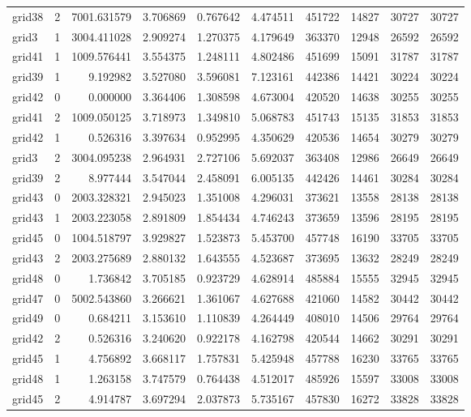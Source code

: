 \begin{longtable}{|l|r|r|r|r|r|r|r|r|r|}
grid38 & 2 & 7001.631579 & 3.706869 & 0.767642 & 4.474511 & 451722 & 14827 & 30727 & 30727 \\
grid3 & 1 & 3004.411028 & 2.909274 & 1.270375 & 4.179649 & 363370 & 12948 & 26592 & 26592 \\
grid41 & 1 & 1009.576441 & 3.554375 & 1.248111 & 4.802486 & 451699 & 15091 & 31787 & 31787 \\
grid39 & 1 & 9.192982 & 3.527080 & 3.596081 & 7.123161 & 442386 & 14421 & 30224 & 30224 \\
grid42 & 0 & 0.000000 & 3.364406 & 1.308598 & 4.673004 & 420520 & 14638 & 30255 & 30255 \\
grid41 & 2 & 1009.050125 & 3.718973 & 1.349810 & 5.068783 & 451743 & 15135 & 31853 & 31853 \\
grid42 & 1 & 0.526316 & 3.397634 & 0.952995 & 4.350629 & 420536 & 14654 & 30279 & 30279 \\
grid3 & 2 & 3004.095238 & 2.964931 & 2.727106 & 5.692037 & 363408 & 12986 & 26649 & 26649 \\
grid39 & 2 & 8.977444 & 3.547044 & 2.458091 & 6.005135 & 442426 & 14461 & 30284 & 30284 \\
grid43 & 0 & 2003.328321 & 2.945023 & 1.351008 & 4.296031 & 373621 & 13558 & 28138 & 28138 \\
grid43 & 1 & 2003.223058 & 2.891809 & 1.854434 & 4.746243 & 373659 & 13596 & 28195 & 28195 \\
grid45 & 0 & 1004.518797 & 3.929827 & 1.523873 & 5.453700 & 457748 & 16190 & 33705 & 33705 \\
grid43 & 2 & 2003.275689 & 2.880132 & 1.643555 & 4.523687 & 373695 & 13632 & 28249 & 28249 \\
grid48 & 0 & 1.736842 & 3.705185 & 0.923729 & 4.628914 & 485884 & 15555 & 32945 & 32945 \\
grid47 & 0 & 5002.543860 & 3.266621 & 1.361067 & 4.627688 & 421060 & 14582 & 30442 & 30442 \\
grid49 & 0 & 0.684211 & 3.153610 & 1.110839 & 4.264449 & 408010 & 14506 & 29764 & 29764 \\
grid42 & 2 & 0.526316 & 3.240620 & 0.922178 & 4.162798 & 420544 & 14662 & 30291 & 30291 \\
grid45 & 1 & 4.756892 & 3.668117 & 1.757831 & 5.425948 & 457788 & 16230 & 33765 & 33765 \\
grid48 & 1 & 1.263158 & 3.747579 & 0.764438 & 4.512017 & 485926 & 15597 & 33008 & 33008 \\
grid45 & 2 & 4.914787 & 3.697294 & 2.037873 & 5.735167 & 457830 & 16272 & 33828 & 33828 \\

\end{longtable}
